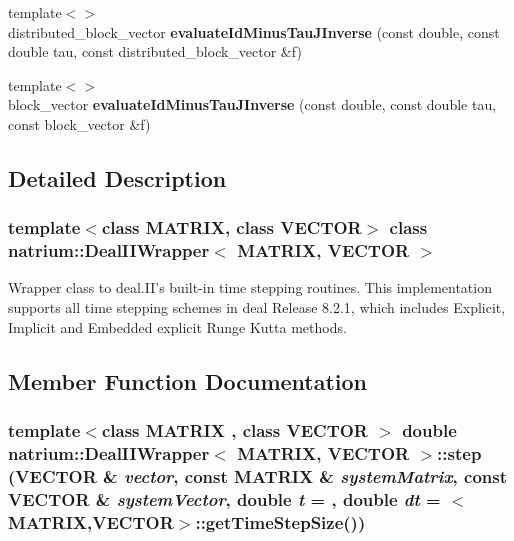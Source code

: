 \begin{DoxyCompactItemize}
\item 
\hypertarget{classnatrium_1_1DealIIWrapper_aea3a4ef30de64fa1c771ff8df4a7c358}{
{\footnotesize template$<$$>$ }\\distributed\_\-block\_\-vector {\bfseries evaluateIdMinusTauJInverse} (const double, const double tau, const distributed\_\-block\_\-vector \&f)}
\label{classnatrium_1_1DealIIWrapper_aea3a4ef30de64fa1c771ff8df4a7c358}

\item 
\hypertarget{classnatrium_1_1DealIIWrapper_a4446840f5a8e7eaad5f96d416b7f4f66}{
{\footnotesize template$<$$>$ }\\block\_\-vector {\bfseries evaluateIdMinusTauJInverse} (const double, const double tau, const block\_\-vector \&f)}
\label{classnatrium_1_1DealIIWrapper_a4446840f5a8e7eaad5f96d416b7f4f66}

\end{DoxyCompactItemize}


\subsection{Detailed Description}
\subsubsection*{template$<$class MATRIX, class VECTOR$>$ class natrium::DealIIWrapper$<$ MATRIX, VECTOR $>$}

Wrapper class to deal.II's built-\/in time stepping routines. This implementation supports all time stepping schemes in deal Release 8.2.1, which includes Explicit, Implicit and Embedded explicit Runge Kutta methods. 

\subsection{Member Function Documentation}
\hypertarget{classnatrium_1_1DealIIWrapper_a62621205ff77a46c4f3ef01c3aefb06d}{
\subsubsection[{step}]{\setlength{\rightskip}{0pt plus 5cm}template$<$class MATRIX , class VECTOR $>$ double {\bf natrium::DealIIWrapper}$<$ MATRIX, VECTOR $>$::step (VECTOR \& {\em vector}, \/  const MATRIX \& {\em systemMatrix}, \/  const VECTOR \& {\em systemVector}, \/  double {\em t} = {}, \/  double {\em dt} = {$<$MATRIX,VECTOR$>$::getTimeStepSize()})}}
\label{classnatrium_1_1DealIIWrapper_a62621205ff77a46c4f3ef01c3aefb06d}


